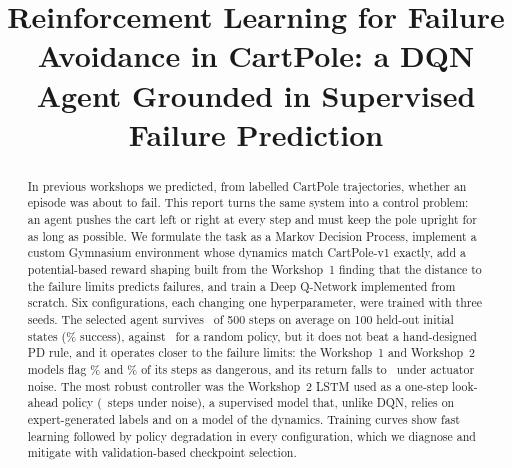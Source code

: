 \documentclass[conference]{IEEEtran}
\begin{document}
\title{Reinforcement Learning for Failure Avoidance in CartPole: a DQN Agent Grounded in Supervised Failure Prediction}

\author{
\and
{}
\and
{}
}

\maketitle

\begin{abstract}
In previous workshops we predicted, from labelled CartPole trajectories, whether an
episode was about to fail. This report turns the same system into a control problem:
an agent pushes the cart left or right at every step and must keep the pole upright
for as long as possible. We formulate the task as a Markov Decision Process, implement
a custom Gymnasium environment whose dynamics match CartPole-v1 exactly, add a
potential-based reward shaping built from the Workshop~1 finding that the distance to
the failure limits predicts failures, and train a Deep Q-Network implemented from
scratch. Six configurations, each changing one hyperparameter, were trained with three
seeds. The selected agent survives \TestDQNMean\ of 500 steps on average on 100
held-out initial states (\TestDQNSuccess\% success), against \TestRandMean\ for a random
policy, but it does not beat a hand-designed PD rule, and it operates closer to the
failure limits: the Workshop~1 and Workshop~2 models flag \TestDQNDanger\% and
\TestDQNDangerWTwo\% of its steps as dangerous, and its return falls to \NoisyDQNMean\
under actuator noise. The most robust controller was the Workshop~2 LSTM used as a
one-step look-ahead policy (\NoisyWTwoMean\ steps under noise), a supervised model
that, unlike DQN, relies on expert-generated labels and on a model of the dynamics.
Training curves show fast learning followed by policy degradation in every
configuration, which we diagnose and mitigate with validation-based checkpoint selection.
\end{abstract}
\end{document}
